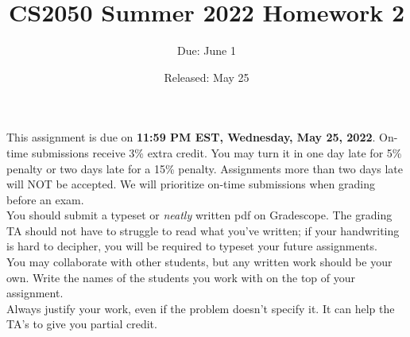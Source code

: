\documentclass{article}
\title{CS2050 Summer 2022 Homework 2}
\author{Due: June 1}
\date{Released: May 25}
\begin{document}
\maketitle

This assignment is due on \textbf{11:59 PM EST, Wednesday, May 25, 2022}.  On-time submissions receive 3\% extra credit. You may turn it in one day late for 5\% penalty or two days late for a 15\% penalty. Assignments more than two days late will NOT be accepted.  We will prioritize on-time submissions when grading before an exam. \\ 

You should submit a typeset or \emph{neatly} written pdf on Gradescope.  The grading TA should not have to struggle to read what you've written; if your handwriting is hard to decipher, you will be required to typeset your future assignments.\\ 

You may collaborate with other students, but any written work should be your own. Write the names of the students you work with on the top of your assignment.\\

Always justify your work, even if the problem doesn't specify it. It can help the TA's to give you partial credit.



\clearpage
\end{document}

